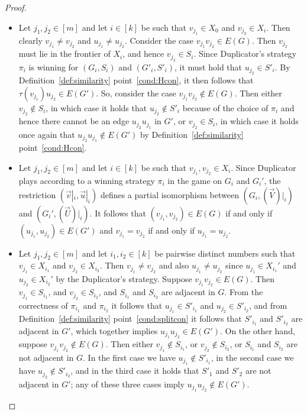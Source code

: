 \documentclass{llncs}
\begin{document}
{\begin{proof}
\begin{itemize}
    \item Let $j_1,j_2 \in [m]$ and let $i\in [k]$ be such that $v_{j_1}\in X_0$ and $v_{j_2}\in X_i$. Then clearly $v_{j_1}\neq v_{j_2}$ and $u_{j_1}\neq u_{j_2}$. Consider the case $v_{j_1}v_{j_2}\in E(G)$. Then $v_{j_2}$ must lie in the frontier of $X_i$, and hence $v_{j_2}\in S_i$. Since Duplicator's strategy $\pi_i$ is winning for $(G_i,S_i)$ and $(G'_i,S'_i)$, it must hold that $u_{j_2}\in S'_i$. By Definition~\ref{def:similarity} point~\ref{cond:Hcon}, it then follows that $\tau(v_{j_1})u_{j_2}\in E(G')$. So, consider the case $v_{j_1}v_{j_2}\not \in E(G)$. Then either $v_{j_2}\not \in S_i$, in which case it holds that $u_{j_2}\not \in S'_i$ because of the choice of $\pi_i$ and hence there cannot be an edge $u_{j_2}u_{j_1}$ in $G'$, or $v_{j_2}\in S_i$, in which case it holds once again that $u_{j_2}u_{j_1}\not \in E(G')$ by Definition~\ref{def:similarity} point~\ref{cond:Hcon}.
    
    \item Let $j_1,j_2 \in [m]$ and let $i \in [k]$ be such that $v_{j_1},v_{j_2}
      \in X_{i}$. Since
      Duplicator plays according to a winning strategy $\pi_i$ in the game on $G_i$
      and $G_i'$, the restriction $(\vec{v}|_i, \vec{u}|_i)$ defines a partial
      isomorphism between $(G_i, (\vec{V})|_i)$ and $(G_i',
      (\vec{U})|_i)$. It follows that $(v_{j_1},v_{j_2}) \in E(G)$ if
      and only if $(u_{j_1},u_{j_2}) \in E(G')$ and $v_{j_1} = v_{j_2}$ if and
      only if $u_{j_1} = u_{j_2}$.  
    
      \item Let $j_1,j_2 \in [m]$ and let $i_1,i_2 \in [k]$ be pairwise distinct numbers such that $v_{j_1}\in X_{i_1}$ and $v_{j_2}\in X_{i_2}$. Then $v_{j_1}
      \neq v_{j_2}$ and also $u_{j_1} \neq u_{j_2}$ since $u_{j_1} \in 
      X_{i_1}'$ and $u_{j_2} \in X_{i_2}'$ by the Duplicator's strategy. Suppose $v_{j_1}v_{j_2}\in E(G)$. Then $v_{j_1}\in S_{i_1}$, and $v_{j_2}\in S_{i_2}$, and $S_{i_1}$ and $S_{i_2}$ are adjacent in $G$. From the correctness of $\pi_{i_1}$ and $\pi_{i_2}$ it follows that $u_{j_1}\in S'_{i_1}$ and $u_{j_2}\in S'_{i_2}$, and from Definition~\ref{def:similarity} point~\ref{cond:splitcon} it follows that $S'_{i_1}$ and $S'_{i_2}$ are adjacent in $G'$, which together implies  $u_{j_1}u_{j_2}\in E(G')$. On the other hand, suppose $v_{j_1}v_{j_2}\not \in E(G)$. Then either $v_{j_1}\not \in S_{i_1}$, or $v_{j_2}\not \in S_{i_2}$, or $S_{i_1}$ and $S_{i_2}$ are not adjacent in $G$. In the first case we have $u_{j_1}\not \in S'_{i_1}$, in the second case we have $u_{j_2}\not \in S'_{i_2}$, and in the third case it holds that $S'_1$ and $S'_2$ are not adjacent in $G'$; any of these three cases imply $u_{j_1}u_{j_2}\not \in E(G')$.
    

\end{itemize}
\end{proof}}
\end{document}
